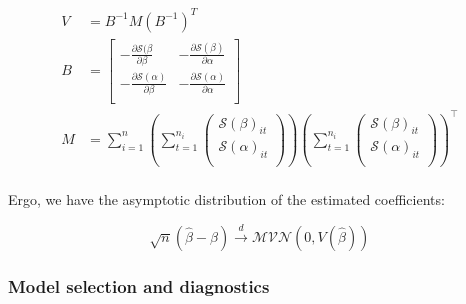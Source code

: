 \documentclass{report}
\begin{document}
\begin{equation}\label{eq:glm-gee-beta-asymptotics-2}
    \begin{aligned}
        V &= B^{-1} M \left(B^{-1}\right)^T \\
        B &= \begin{bmatrix}
            -\frac{\partial\mathcal{S}(\beta}{\partial\beta} & -\frac{\partial\mathcal{S}(\beta)}{\partial\alpha} \\
            -\frac{\partial\mathcal{S}(\alpha)}{\partial\beta} & -\frac{\partial\mathcal{S}(\alpha)}{\partial\alpha} \\
        \end{bmatrix} \\
        M &= \sum_{i=1}^n \left(\sum_{t=1}^{n_i} \begin{pmatrix}
            \mathcal{S}(\beta)_{it} \\
            \mathcal{S}(\alpha)_{it} \\
        \end{pmatrix}\right)\left(\sum_{t=1}^{n_i} \begin{pmatrix}
            \mathcal{S}(\beta)_{it} \\
            \mathcal{S}(\alpha)_{it} \\
        \end{pmatrix}\right)^\intercal \\ 
    \end{aligned}
\end{equation}

Ergo, we have the asymptotic distribution of the estimated coefficients:

\begin{equation}\label{eq:glm-gee-beta-asymptotics-3}
    \sqrt{n}\left(\hat{\beta} - \beta\right) \overset{d}{\to} \mathcal{MVN}\left(0, V\left(\hat{\beta}\right)\right)
\end{equation}

\subsubsection{Model selection and diagnostics}
\end{document}
